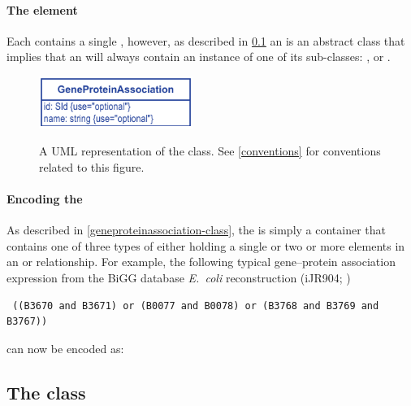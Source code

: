 \paragraph{The  element}
Each \GeneProteinAssociation contains a single \Association, however, as
described in \ref{association-class} an \Association is an abstract class
that implies that an  will always contain an instance
of one of its sub-classes: \GeneAnd, \GeneOr or \GeneProductRef.
%
\begin{figure}[h!]
  \centering
  \includegraphics[width=5cm]{images/v2harmony_fbc_geneproductassociation.pdf}\\
  \caption{A UML representation of the \FBCPackage \GeneProteinAssociation class.
	See  \ref{conventions} for conventions related to this figure.}
  \label{fig:fbc_uml_ga}
\end{figure}

\paragraph{Encoding the \GeneProteinAssociation}
As described in \ref{geneproteinassociation-class}, the \GeneProteinAssociation
is simply a container that contains one of three types of \Association either
holding a single \GeneProductRef or two or more \Association elements in an
\GeneAnd or \GeneOr relationship. For example, the following typical
gene--protein association expression from the BiGG database \emph{E.~coli}
reconstruction (iJR904; \citealt{ijr904, bigg})
%
\begin{verbatim}
 ((B3670 and B3671) or (B0077 and B0078) or (B3768 and B3769 and B3767))
\end{verbatim}
%
can now be encoded as:
%
\pagebreak
\subsection{The \FBC {} class}
\label{association-class}

